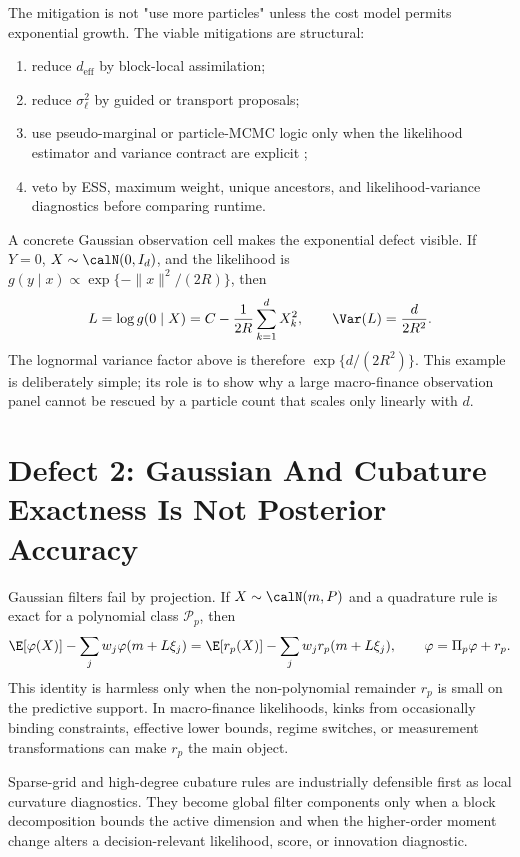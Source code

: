 The mitigation is not "use more particles" unless the cost model permits
exponential growth.  The viable mitigations are structural:
\begin{enumerate}[label=(\arabic*)]
  \item reduce \(d_{\mathrm{eff}}\) by block-local assimilation;
  \item reduce \(\sigma_\ell^2\) by guided or transport proposals;
  \item use pseudo-marginal or particle-MCMC logic only when the likelihood
    estimator and variance contract are explicit
    \citep{andrieu2009pseudo,andrieu2010particle};
  \item veto by ESS, maximum weight, unique ancestors, and likelihood-variance
    diagnostics before comparing runtime.
\end{enumerate}

A concrete Gaussian observation cell makes the exponential defect visible.  If
\(Y=0\), \(X\sim\calN(0,I_d)\), and the likelihood is
\(g(y\mid x)\propto \exp\{-\|x\|^2/(2R)\}\), then
\[
  L=\log g(0\mid X)=C-\frac{1}{2R}\sum_{k=1}^d X_k^2,\qquad
  \Var(L)=\frac{d}{2R^2}.
\]
The lognormal variance factor above is therefore \(\exp\{d/(2R^2)\}\).  This
example is deliberately simple; its role is to show why a large macro-finance
observation panel cannot be rescued by a particle count that scales only
linearly with \(d\).

\section{Defect 2: Gaussian And Cubature Exactness Is Not Posterior Accuracy}
\label{sec:bf-hd-defect-gaussian}

Gaussian filters fail by projection.  If \(X\sim\calN(m,P)\) and a quadrature
rule is exact for a polynomial class \(\mathcal P_p\), then
\begin{equation}
  \E[\varphi(X)]-\sum_j w_j\varphi(m+L\xi_j)
  =
  \E[r_p(X)]-\sum_j w_j r_p(m+L\xi_j),
  \qquad
  \varphi=\Pi_p\varphi+r_p .
  \label{eq:bf-hd-synth-quadrature-remainder}
\end{equation}
This identity is harmless only when the non-polynomial remainder \(r_p\) is
small on the predictive support.  In macro-finance likelihoods, kinks from
occasionally binding constraints, effective lower bounds, regime switches, or
measurement transformations can make \(r_p\) the main object.

\begin{proposition}
\label{prop:bf-hd-local-cubature-diagnostic}
Sparse-grid and high-degree cubature rules are industrially defensible first as
local curvature diagnostics.  They become global filter components only when a
block decomposition bounds the active dimension and when the higher-order
moment change alters a decision-relevant likelihood, score, or innovation
diagnostic.
\end{proposition}

